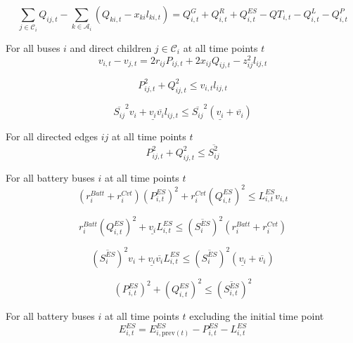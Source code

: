 \documentclass{article}
\newcommand{\lo}[1]{\underline{#1}}
\newcommand{\hi}[1]{\overline{#1}}
\def\sC{\mathcal C}
\def\sA{\mathcal A}
\begin{document}
\begin{equation}
  \sum_{j \in \sC_i} Q_{ij,t} - \sum_{k \in \sA_i} (Q_{ki,t} - x_{ki} l_{ki,t}) =
  Q^G_{i,t} + Q^R_{i,t} + Q^{ES}_{i,t} - QT_{i,t} - Q^L_{i,t} - Q^P_{i,t}
\end{equation}


For all buses $i$ and direct children $j \in \sC_i$ at all time points $t$
\begin{equation}
  v_{i,t} - v_{j,t} = 2r_{ij}P_{ij,t} + 2x_{ij}Q_{ij,t} - z^2_{ij}l_{ij,t}
\end{equation}

\begin{equation}
  P^2_{ij,t} + Q^2_{ij,t} \leq v_{i,t} l_{ij,t}
\end{equation}

\begin{equation}
  \hi{S_{ij}}^2v_i + \lo{v_i}\hi{v_i}l_{ij,t} \leq
  \hi{S_{ij}}^2 (\lo{v_i} + \hi{v_i})
\end{equation}

For all directed edges $ij$ at all time points $t$
\begin{equation}
  P^2_{ij,t} + Q^2_{ij,t} \leq \hi{S^2_{ij}}
\end{equation}

For all battery buses $i$ at all time points $t$
\begin{equation}
  (r^{Batt}_i + r^{Cvt}_i)(P^{ES}_{i,t})^2 + r^{Cvt}_i (Q^{ES}_{i,t})^2 \leq
  L^{ES}_{i,t}v_{i,t}
\end{equation}

\begin{equation}
  r^{Batt}_i (Q^{ES}_{i,t})^2 + \lo{v_i} L^{ES}_{i,t} \leq
  (\hi{S^{ES}_i})^2(r^{Batt}_i + r^{Cvt}_i)
\end{equation}

\begin{equation}
  (\hi{S^{ES}_i})^2v_i + \lo{v_i}\hi{v_i}L^{ES}_{i,t} \leq
  (\hi{S^{ES}_i})^2(\lo{v_i} + \hi{v_i})
\end{equation}

\begin{equation}
  (P^{ES}_{i,t})^2 + (Q^{ES}_{i,t})^2 \leq (\hi{S^{ES}_{i,t}})^2
\end{equation}

For all battery buses $i$ at all time points $t$ excluding the initial time
point
\begin{equation}
  E^{ES}_{i,t} = E^{ES}_{i,\text{prev}(t)} - P^{ES}_{i,t} - L^{ES}_{i,t}
\end{equation}
\end{document}
